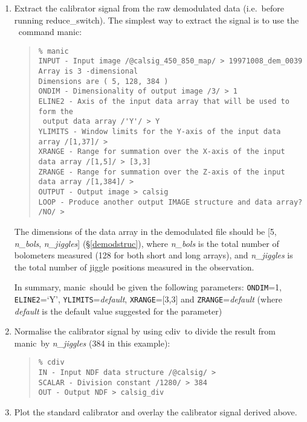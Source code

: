 \documentclass[twoside,11pt]{article}
\newcommand{\Kappa}{\xref{{\sc{Kappa}}}{sun95}{}}
\newcommand{\task}[1]{{\sf #1}}
\newcommand{\param}[1]{{\tt #1}}
\newcommand{\resw}{\htmlref{\task{reduce\_switch}}{REDUCE_SWITCH}}
\newcommand{\manic}{\xref{\task{manic}}{sun95}{MANIC}}
\newcommand{\cdiv}{\xref{\task{cdiv}}{sun95}{CDIV}}
\newenvironment{myquote}{\begin{quote}\begin{small}}{\end{small}\end{quote}}
\newcommand{\htmlref}[2]{#1}
\newcommand{\xref}[3]{#1}
\begin{document}
\begin{enumerate}

\item Extract the calibrator signal from the raw demodulated data (i.e.\
before running \resw). The simplest way to extract the signal is to use
the \Kappa\ command \manic:

\begin{myquote}
\begin{verbatim}
% manic
INPUT - Input image /@calsig_450_850_map/ > 19971008_dem_0039
Array is 3 -dimensional
Dimensions are ( 5, 128, 384 )
ONDIM - Dimensionality of output image /3/ > 1
ELINE2 - Axis of the input data array that will be used to form the 
 output data array /'Y'/ > Y
YLIMITS - Window limits for the Y-axis of the input data array /[1,37]/ > 
XRANGE - Range for summation over the X-axis of the input data array /[1,5]/ > [3,3]
ZRANGE - Range for summation over the Z-axis of the input data array /[1,384]/ > 
OUTPUT - Output image > calsig
LOOP - Produce another output IMAGE structure and data array? /NO/ > 
\end{verbatim}
\end{myquote}

The dimensions of the data array in the demodulated file should be [5,
\textit{n\_bols}, \textit{n\_jiggles}] (\S\ref{demodstruc}), where
\textit{n\_bols} is the total number of bolometers measured (128 for both
short and long arrays), and \textit{n\_jiggles} is the total number of jiggle
positions measured in the observation.

In summary, \manic\ should be given the following parameters: \param{ONDIM}=1,
\param{ELINE2}=`Y', \param{YLIMITS}=\textit{default}, \param{XRANGE}=[3,3] and
\param{ZRANGE}=\textit{default} 
(where \textit{default} is the default value suggested for the parameter)


\item Normalise the calibrator signal by using \cdiv\ to divide the result
from \manic\ by \textit{n\_jiggles} (384 in this example):

\begin{myquote}
\begin{verbatim}
% cdiv
IN - Input NDF data structure /@calsig/ > 
SCALAR - Division constant /1280/ > 384
OUT - Output NDF > calsig_div
\end{verbatim}
\end{myquote}

\item Plot the standard calibrator and overlay the calibrator signal derived
above. 


\end{enumerate}
\end{document}
